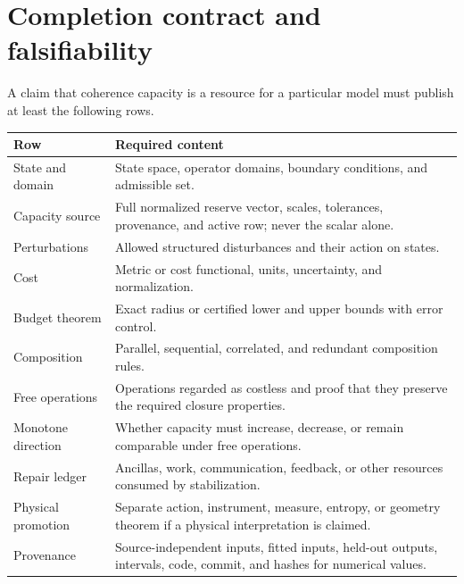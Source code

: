 \documentclass[11pt]{article}
\theoremstyle{definition}
\theoremstyle{remark}
\begin{document}
\section{Completion contract and falsifiability}
\label{sec:contract}

A claim that coherence capacity is a resource for a particular model must
publish at least the following rows.

\begin{center}
\begin{tabularx}{\textwidth}{@{}L{0.25\textwidth}Y@{}}
\toprule
Row & Required content \\
\midrule
State and domain
& State space, operator domains, boundary conditions, and admissible set.\\

Capacity source
& Full normalized reserve vector, scales, tolerances, provenance, and active
  row; never the scalar alone.\\

Perturbations
& Allowed structured disturbances and their action on states.\\

Cost
& Metric or cost functional, units, uncertainty, and normalization.\\

Budget theorem
& Exact radius or certified lower and upper bounds with error control.\\

Composition
& Parallel, sequential, correlated, and redundant composition rules.\\

Free operations
& Operations regarded as costless and proof that they preserve the required
  closure properties.\\

Monotone direction
& Whether capacity must increase, decrease, or remain comparable under free
  operations.\\

Repair ledger
& Ancillas, work, communication, feedback, or other resources consumed by
  stabilization.\\

Physical promotion
& Separate action, instrument, measure, entropy, or geometry theorem if a
  physical interpretation is claimed.\\

Provenance
& Source-independent inputs, fitted inputs, held-out outputs, intervals,
  code, commit, and hashes for numerical values.\\
\bottomrule
\end{tabularx}
\end{center}
\end{document}

